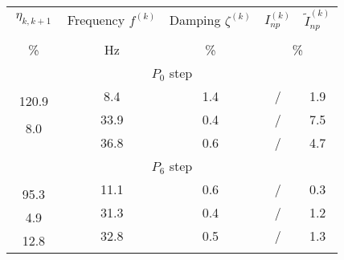 \begin{tabular}{|ccccc|}
\hline
\multicolumn{1}{|c|}{\multirow{2.5}{*}{$\ \eta_{k, k+1}\ $}} & 
\multicolumn{1}{c|}{\multirow{2.5}{*}{Frequency $f^{(k)}$}} & 
\multicolumn{1}{c|}{\multirow{2.5}{*}{Damping $\zeta^{(k)}$}} & 
\multicolumn{1}{c}{\multirow{2.5}{*}{$I_{np}^{(k)}$}} & 
\multirow{2.5}{*}{$\tilde I_{np}^{(k)}$} \\
\multicolumn{1}{|c|}{} & \multicolumn{1}{c|}{} & \multicolumn{1}{c|}{} & \multicolumn{2}{c|}{} \\
\multicolumn{1}{|c|}{\multirow{2}{*}{\%}} & 
\multicolumn{1}{c|}{\multirow{2}{*}{Hz}} & 
\multicolumn{1}{c|}{\multirow{2}{*}{\%}} & 
\multicolumn{2}{c|}{\multirow{2}{*}{\%}} \\
\multicolumn{1}{|c|}{} & \multicolumn{1}{c|}{} & \multicolumn{1}{c|}{} & & \\ \hline \hline
\multicolumn{5}{|c|}{\multirow{2}{*}{$P_0$ step}} \\
\multicolumn{5}{|c|}{} \\ \hline
 & \multirow{2}{*}{8.4} & \multirow{2}{*}{1.4} & \multirow{2}{*}{/} & \multirow{2}{*}{1.9} \\ %
\multirow{2}{*}{120.9} & & & & \\ \cline{2-5} 
 & \multirow{2}{*}{33.9} & \multirow{2}{*}{0.4} & \multirow{2}{*}{/} & \multirow{2}{*}{7.5} \\ %
\multirow{2}{*}{8.0} & & & & \\ \cline{2-5} 
 & \multirow{2}{*}{36.8} & \multirow{2}{*}{0.6} & \multirow{2}{*}{/} & \multirow{2}{*}{4.7} \\ %
 & & & & \\ \hline \hline
\multicolumn{5}{|c|}{\multirow{2}{*}{$P_6$ step}} \\
\multicolumn{5}{|c|}{} \\ \hline
 & \multirow{2}{*}{11.1} & \multirow{2}{*}{0.6} & \multirow{2}{*}{/} & \multirow{2}{*}{0.3} \\ %
\multirow{2}{*}{95.3} & & & & \\ \cline{2-5} 
 & \multirow{2}{*}{31.3} & \multirow{2}{*}{0.4} & \multirow{2}{*}{/} & \multirow{2}{*}{1.2} \\ %
\multirow{2}{*}{4.9} & & & & \\ \cline{2-5} 
 & \multirow{2}{*}{32.8} & \multirow{2}{*}{0.5} & \multirow{2}{*}{/} & \multirow{2}{*}{1.3} \\ %
\multirow{2}{*}{12.8} & & & & \\ \cline{2-5} 

\end{tabular}
